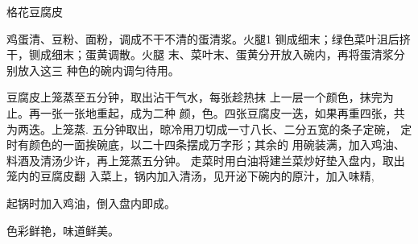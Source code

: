 \begin{recipe}{格花豆腐皮}

\ingredients


\cooking

\step 鸡蛋清、豆粉、面粉，调成不干不清的蛋清浆。火腿1 铡成细末；绿色菜叶沮后挤干，铡成细末；蛋黄调散。火腿 末、菜叶末、蛋黄分开放入碗内，再将蛋清浆分别放入这三 种色的碗内调匀待用。

\step 豆腐皮上笼蒸至五分钟，取出沾干气水，每张趁热抹 上一层一个颜色，抹完为止。再一张一张地重起，成为二种 颜，色。四张豆腐皮一迭，如果再重四张，共为两迭。上笼蒸. 五分钟取出，晾冷用刀切成一寸八长、二分五宽的条子定碗， 定时有颜色的一面挨碗底，以二十四条摆成万字形；其余的 用碗装满，加入鸡油、料酒及清汤少许，再上笼蒸五分钟。 走菜时用白油将建兰菜炒好垫入盘内，取出笼内的豆腐皮翻 入菜上，锅内加入清汤，见开泌下碗内的原汁，加入味精,

起锅时加入鸡油，倒入盘内即成。

\notes

色彩鲜艳，味道鲜美。

\end{recipe}

